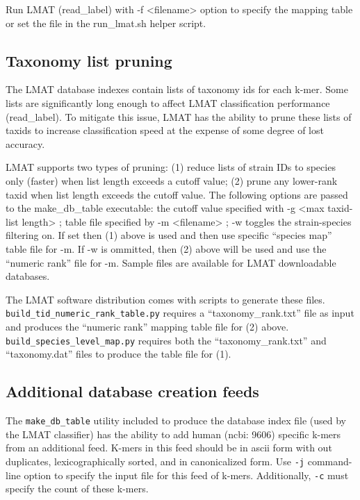 \documentclass[11pt]{article}
\begin{document}
Run LMAT (read\_label) with -f <filename> option to specify the mapping table or set the file in the run\_lmat.sh helper script.

\subsection{Taxonomy list pruning}

The LMAT database indexes contain lists of taxonomy ids for each k-mer.  Some lists are significantly long enough to affect LMAT classification performance (read\_label).  To mitigate this issue, LMAT has the ability to prune these lists of taxids to increase classification speed at the expense of some degree of lost accuracy.

 LMAT supports two types of pruning: (1) reduce lists of strain IDs to species only (faster) when list length exceeds a cutoff value;  (2) prune any lower-rank taxid when list length exceeds the cutoff value.   The following options are passed to the make\_db\_table executable:
the cutoff value specified with -g <max taxid-list length> ;  table file specified by -m <filename> ; -w toggles the strain-species filtering on.  If set then (1) above is used and then use specific ``species map'' table file for -m.  If -w is ommitted, then (2) above will be used and use the ``numeric rank'' file for -m.  Sample files are available for LMAT downloadable databases.

The LMAT software distribution comes with scripts to generate these files.  \texttt{build_tid_numeric_rank_table.py} requires a ``taxonomy\_rank.txt'' file as input and produces the ``numeric rank'' mapping table file for (2) above.  \texttt{build\_species\_level\_map.py}  requires both the ``taxonomy\_rank.txt'' and  ``taxonomy.dat'' files to  produce the table file for (1).

\subsection{Additional database creation feeds}

The \texttt{make\_db\_table} utility included to produce the database index file (used by the LMAT classifier) has the ability to add human (ncbi: 9606) specific k-mers from an additional feed.  K-mers in this feed should be in ascii form with out duplicates, lexicographically sorted, and in canonicalized form.  Use \texttt{-j} command-line option to specify the input file for this feed of k-mers.  Additionally, \texttt{-c} must specify the count of these k-mers.
\end{document}
